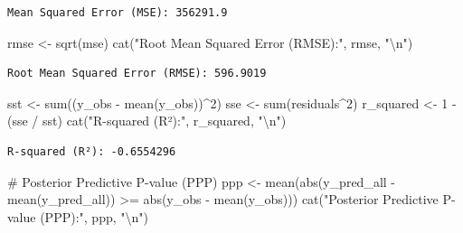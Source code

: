 \documentclass[
  12pt,
]{article}
\newenvironment{Shaded}{\begin{snugshade}}{\end{snugshade}}
\newcommand{\CommentTok}[1]{\textcolor[rgb]{0.37,0.37,0.37}{#1}}
\newcommand{\DecValTok}[1]{\textcolor[rgb]{0.68,0.00,0.00}{#1}}
\newcommand{\FunctionTok}[1]{\textcolor[rgb]{0.28,0.35,0.67}{#1}}
\newcommand{\NormalTok}[1]{\textcolor[rgb]{0.00,0.23,0.31}{#1}}
\newcommand{\OtherTok}[1]{\textcolor[rgb]{0.00,0.23,0.31}{#1}}
\newcommand{\SpecialCharTok}[1]{\textcolor[rgb]{0.37,0.37,0.37}{#1}}
\newcommand{\StringTok}[1]{\textcolor[rgb]{0.13,0.47,0.30}{#1}}
\begin{document}
\begin{verbatim}
Mean Squared Error (MSE): 356291.9 
\end{verbatim}

\begin{Shaded}
\begin{Highlighting}[]
\NormalTok{rmse }\OtherTok{\textless{}{-}} \FunctionTok{sqrt}\NormalTok{(mse)}
\FunctionTok{cat}\NormalTok{(}\StringTok{"Root Mean Squared Error (RMSE):"}\NormalTok{, rmse, }\StringTok{"}\SpecialCharTok{\textbackslash{}n}\StringTok{"}\NormalTok{)}
\end{Highlighting}
\end{Shaded}

\begin{verbatim}
Root Mean Squared Error (RMSE): 596.9019 
\end{verbatim}

\begin{Shaded}
\begin{Highlighting}[]
\NormalTok{sst }\OtherTok{\textless{}{-}} \FunctionTok{sum}\NormalTok{((y\_obs }\SpecialCharTok{{-}} \FunctionTok{mean}\NormalTok{(y\_obs))}\SpecialCharTok{\^{}}\DecValTok{2}\NormalTok{)}
\NormalTok{sse }\OtherTok{\textless{}{-}} \FunctionTok{sum}\NormalTok{(residuals}\SpecialCharTok{\^{}}\DecValTok{2}\NormalTok{)}
\NormalTok{r\_squared }\OtherTok{\textless{}{-}} \DecValTok{1} \SpecialCharTok{{-}}\NormalTok{ (sse }\SpecialCharTok{/}\NormalTok{ sst)}
\FunctionTok{cat}\NormalTok{(}\StringTok{"R{-}squared (R²):"}\NormalTok{, r\_squared, }\StringTok{"}\SpecialCharTok{\textbackslash{}n}\StringTok{"}\NormalTok{)}
\end{Highlighting}
\end{Shaded}

\begin{verbatim}
R-squared (R²): -0.6554296 
\end{verbatim}

\begin{Shaded}
\begin{Highlighting}[]
\CommentTok{\# Posterior Predictive P{-}value (PPP)}
\NormalTok{ppp }\OtherTok{\textless{}{-}} \FunctionTok{mean}\NormalTok{(}\FunctionTok{abs}\NormalTok{(y\_pred\_all }\SpecialCharTok{{-}} \FunctionTok{mean}\NormalTok{(y\_pred\_all)) }\SpecialCharTok{\textgreater{}=} \FunctionTok{abs}\NormalTok{(y\_obs }\SpecialCharTok{{-}} \FunctionTok{mean}\NormalTok{(y\_obs)))}
\FunctionTok{cat}\NormalTok{(}\StringTok{"Posterior Predictive P{-}value (PPP):"}\NormalTok{, ppp, }\StringTok{"}\SpecialCharTok{\textbackslash{}n}\StringTok{"}\NormalTok{)}
\end{Highlighting}
\end{Shaded}
\end{document}

